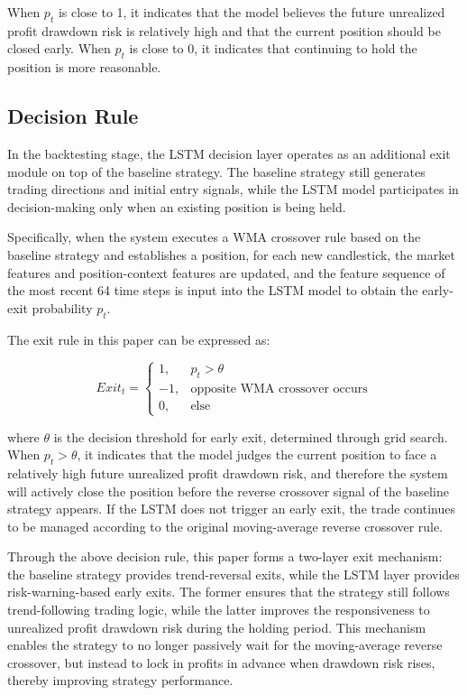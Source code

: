 \documentclass[12pt]{article}
\begin{document}
When $p_t$ is close to 1, it indicates that the model believes the future unrealized profit drawdown risk is relatively high and that the current position should be closed early. When $p_t$ is close to 0, it indicates that continuing to hold the position is more reasonable.

\subsection{Decision Rule}

In the backtesting stage, the LSTM decision layer operates as an additional exit module on top of the baseline strategy. The baseline strategy still generates trading directions and initial entry signals, while the LSTM model participates in decision-making only when an existing position is being held.

Specifically, when the system executes a WMA crossover rule based on the baseline strategy and establishes a position, for each new candlestick, the market features and position-context features are updated, and the feature sequence of the most recent 64 time steps is input into the LSTM model to obtain the early-exit probability $p_t$.

The exit rule in this paper can be expressed as:

\begin{equation}
    Exit_t =
    \begin{cases}
    1, & p_t > \theta \\
    -1, & \text{opposite WMA crossover occurs} \\
    0, & \text{else}
    \end{cases}
\end{equation}

where $\theta$ is the decision threshold for early exit, determined through grid search. When $p_t > \theta$, it indicates that the model judges the current position to face a relatively high future unrealized profit drawdown risk, and therefore the system will actively close the position before the reverse crossover signal of the baseline strategy appears. If the LSTM does not trigger an early exit, the trade continues to be managed according to the original moving-average reverse crossover rule.

Through the above decision rule, this paper forms a two-layer exit mechanism: the baseline strategy provides trend-reversal exits, while the LSTM layer provides risk-warning-based early exits. The former ensures that the strategy still follows trend-following trading logic, while the latter improves the responsiveness to unrealized profit drawdown risk during the holding period. This mechanism enables the strategy to no longer passively wait for the moving-average reverse crossover, but instead to lock in profits in advance when drawdown risk rises, thereby improving strategy performance.
\end{document}
